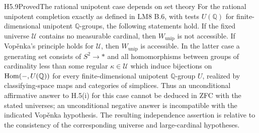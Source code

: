 \begin{claim}{H5.9}{Proved}{The rational unipotent case depends on set theory}
For the rational unipotent completion exactly as defined in LM8 B.6,
with tests $U(\mathbb Q)$ for finite-dimensional unipotent
$\mathbb Q$-groups, the following statements hold.
If the fixed universe $\mathcal U$ contains no measurable cardinal,
then $W_{\mathrm{unip}}$ is not accessible. If Vop\v enka's principle
holds for $\mathcal U$, then $W_{\mathrm{unip}}$ is accessible.
In the latter case a generating set consists of $S^2\to *$ and
all homomorphisms between groups of cardinality less than some
regular $\kappa\in\mathcal U$ which induce bijections on
$\operatorname{Hom}(-,U(\mathbb Q))$ for every finite-dimensional unipotent
$\mathbb Q$-group $U$, realized by classifying-space maps and
categories of simplices.
Thus an unconditional affirmative answer to H.5(i) for this case
cannot be deduced in ZFC with the stated universes; an unconditional
negative answer is incompatible with the indicated Vop\v enka
hypothesis. The resulting independence assertion is relative to
the consistency of the corresponding universe and large-cardinal
hypotheses.
\end{claim}
